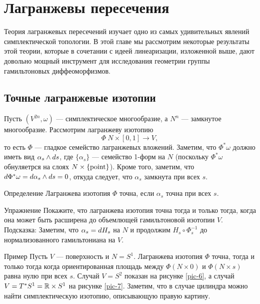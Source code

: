 \chapter{Лагранжевы пересечения}\label{chap:6}

Теория лагранжевых пересечений изучает одно из самых удивительных явлений симплектической топологии.
В этой главе мы рассмотрим некоторые результаты этой теории, которые в сочетании с идеей линеаризации, изложенной выше, дают довольно мощный инструмент для исследования геометрии группы гамильтоновых диффеоморфизмов.

\section{Точные лагранжевые изотопии}
Пусть $(V^{2n}, \omega)$ --- симплектическое многообразие, а $N^n$ ---
замкнутое многообразие. 
Рассмотрим лагранжеву изотопию
\[\Phi\: N \times [0, 1] \to V,\]
то есть $\Phi$ --- гладкое семейство лагранжевых вложений.
Заметим, что $\Phi^\ast \omega$ должно иметь вид $\alpha_s \wedge d
s$, где $\{\alpha_s\}$ --- семейство 1-форм на $N$ (поскольку
$\Phi^\ast \omega$ обнуляетрся на слоях $N \times \{\mathrm{point}\}$). 
Кроме того, заметим, что $d \Phi^\ast \omega = d \alpha_s \wedge d
s = 0$, откуда следует, что $\alpha_s$ замкнута при всех $s$. 

\begin{thm*}{Определение}
Лагранжева изотопия $\Phi$ точна, если $\alpha_s$ точна при всех $s$.
\end{thm*}

\begin{thm}{Упражнение}\label{6.1.A}
Покажите, что лагранжева изотопия точна тогда и только тогда, когда
она может быть расширена до объемлющей гамильтоновой изотопии $V$. 
Подсказка: Заметим, что $\alpha_s \z= \d  H_s$ на $N$ и продолжим $H_s
\circ \Phi^{-1}_s$ до нормализованного гамильтониана на $V$. 
\end{thm}

\begin{thm*}{Пример}
Пусть $V$ --- поверхность и $N = S^1$.
Лагранжева изотопия $\Phi$ точна, тогда и только тогда когда
ориентированная площадь между $\Phi (N \times {0})$ и $\Phi (N \times
{s})$ равна нулю при всех $s$. 
Случай $V = S^2$ показан на рисунке \ref{pic-6}, а  случай $V = T^\ast S^1 \z= \RR \times S^1$ на рисунке \ref{pic-7}.
Заметим, что в случае цилиндра можно найти симплектическую изотопию, описывающую правую картину.
\end{thm*}



